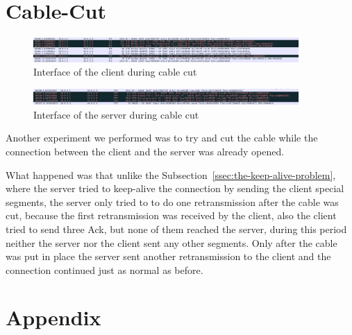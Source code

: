 \documentclass{exam}
\begin{document}
\section{Cable-Cut}
\begin{figure}[H]
    \centering
    \includegraphics[width=0.9\textwidth]{cable-client.png}
    \caption{Interface of the client during cable cut}
    \label{fig:cable-client}
\end{figure}
\begin{figure}[H]
    \centering
    \includegraphics[width=0.9\textwidth]{cable-server.png}
    \caption{Interface of the server during cable cut}
    \label{fig:cable-server}
\end{figure}
Another experiment we performed was to try and cut the cable while the connection between the client and the server was already opened.

What happened was that unlike the Subsection~\ref{ssec:the-keep-alive-problem}, where the server tried to keep-alive the connection by sending the client special segments, the server only tried to to do one retransmission after the cable was cut, because the first retransmission was received by the client, also the client tried to send three Ack, but none of them reached the server, during this period neither the server nor the client sent any other segments. Only after the cable was put in place the server sent another retransmission to the client and the connection continued just as normal as before.



\pagebreak
\section{Appendix}
\end{document}
